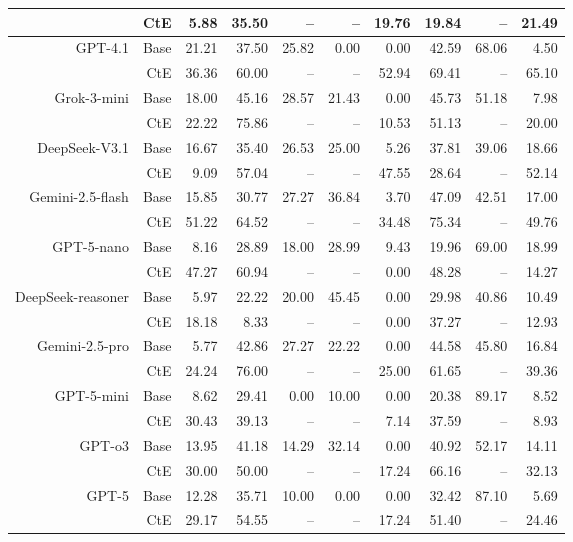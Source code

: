 \begin{table}[!t]
\begin{tabular}{r r !{\color{white!80!black} \vline} r r r r r !{\color{white!80!black} \vline} r r r}
 & CtE & 5.88 & 35.50 & -- & -- & 19.76 & 19.84 & -- & 21.49 \\ \midrule
 \sf GPT-4.1 & Base & 21.21 & 37.50 & 25.82 & 0.00 & 0.00 & 42.59 & 68.06 & 4.50 \\
 & CtE & 36.36 & 60.00 & -- & -- & 52.94 & 69.41 & -- & 65.10 \\ \midrule
 \sf Grok-3-mini & Base & 18.00 & 45.16 & 28.57 & 21.43 & 0.00 & 45.73 & 51.18 & 7.98 \\
 & CtE & 22.22 & 75.86 & -- & -- & 10.53 & 51.13 & -- & 20.00 \\ \midrule
 \sf DeepSeek-V3.1 & Base & 16.67 & 35.40 & 26.53 & 25.00 & 5.26 & 37.81 & 39.06 & 18.66 \\
 & CtE & 9.09 & 57.04 & -- & -- & 47.55 & 28.64 & -- & 52.14 \\ \midrule
 \sf Gemini-2.5-flash & Base & 15.85 & 30.77 & 27.27 & 36.84 & 3.70 & 47.09 & 42.51 & 17.00 \\
 & CtE & 51.22 & 64.52 & -- & -- & 34.48 & 75.34 & -- & 49.76 \\ \midrule
 \sf GPT-5-nano & Base & 8.16 & 28.89 & 18.00 & 28.99 & 9.43 & 19.96 & 69.00 & 18.99 \\
 & CtE & 47.27 & 60.94 & -- & -- & 0.00 & 48.28 & -- & 14.27 \\ \midrule
 \sf DeepSeek-reasoner & Base & 5.97 & 22.22 & 20.00 & 45.45 & 0.00 & 29.98 & 40.86 & 10.49 \\
 & CtE & 18.18 & 8.33 & -- & -- & 0.00 & 37.27 & -- & 12.93 \\ \midrule
 \sf Gemini-2.5-pro & Base & 5.77 & 42.86 & 27.27 & 22.22 & 0.00 & 44.58 & 45.80 & 16.84 \\
 & CtE & 24.24 & 76.00 & -- & -- & 25.00 & 61.65 & -- & 39.36 \\ \midrule
 \sf GPT-5-mini & Base & 8.62 & 29.41 & 0.00 & 10.00 & 0.00 & 20.38 & 89.17 & 8.52 \\
 & CtE & 30.43 & 39.13 & -- & -- & 7.14 & 37.59 & -- & 8.93 \\ \midrule
 \sf GPT-o3 & Base & 13.95 & 41.18 & 14.29 & 32.14 & 0.00 & 40.92 & 52.17 & 14.11 \\
 & CtE & 30.00 & 50.00 & -- & -- & 17.24 & 66.16 & -- & 32.13 \\ \midrule
 \sf GPT-5 & Base & 12.28 & 35.71 & 10.00 & 0.00 & 0.00 & 32.42 & 87.10 & 5.69 \\
 & CtE & 29.17 & 54.55 & -- & -- & 17.24 & 51.40 & -- & 24.46 \\ 
\bottomrule
\end{tabular}
\label{tab:cRi-}
\end{table}
